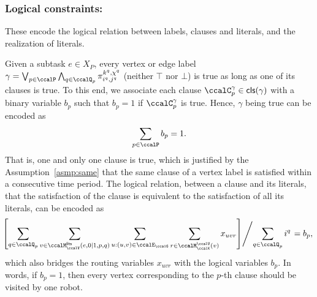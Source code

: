 \documentclass[Afour,sageh,times]{sagej}
\newcommand{\clause}[1]{\mathsf{cls}(#1)}
\renewcommand{\ap}[3]{\mathcal{\pi}_{{#1},{#2}}^{#3}}
\begin{document}
{  \subsubsection{Logical constraints:}\label{sec:labelconstraints} These encode the logical relation between labels, clauses and literals, and the realization of literals.
                {Given a subtask $e\in X_P$, every vertex or edge label  $\gamma  = \bigvee_{p\in \ccalP} \bigwedge_{q\in \ccalQ_p} \ap{i^q}{j^q}{k^q,\chi^q}$ (neither $\top$ nor $\bot$) is true as long as one of its clauses is true.  To this end, we associate each clause  $\ccalC_{p}^{\gamma} \in \clause{\gamma}$ with a binary variable $b_p$ such that $b_p=1$ if $\ccalC_{p}^{\gamma}$ is true. Hence, $\gamma$ being true can be encoded as
\begingroup\makeatletter\def\f@size{10}\check@mathfonts
\def\maketag@@@#1{\hbox{\m@th\normalsize\normalfont#1}}%
\begin{align}\label{eq:c}
   \sum_{p  \in \ccalP} b_p = 1.
\end{align}
\endgroup
That is, one and only one clause is true, which is justified by the Assumption~\ref{asmp:same} that the same clause of a vertex label is satisfied within a consecutive time period. The logical relation, between a clause and its literals, that the satisfaction of the clause is equivalent to the satisfaction of all its literals, can be encoded as
\begingroup\makeatletter\def\f@size{9}\check@mathfonts
\def\maketag@@@#1{\hbox{\m@th\normalsize\normalfont#1}}%
\begin{align}
 \!\!\!  \left. \left[ \sum_{q\in \ccalQ_p} \sum_{v \in \ccalM^\mathsf{lits}_{\ccalV}(e,0|1,p,q)} \sum_{u: (u,v) \in \ccalE_\ccalG} \sum_{r\in \ccalM^\ccalV_{\ccalK}(v)} x_{uvr} \right] \middle/ {\sum_{q\in \ccalQ_p} i^q} \right.= b_p, \label{eq:6}
\end{align}
\endgroup
which also bridges the routing variables $x_{uvr}$ with the logical variables $b_p$. In words, if $b_p=1$, then every vertex corresponding to the $p$-th clause should be visited by one robot.

}}
\end{document}
